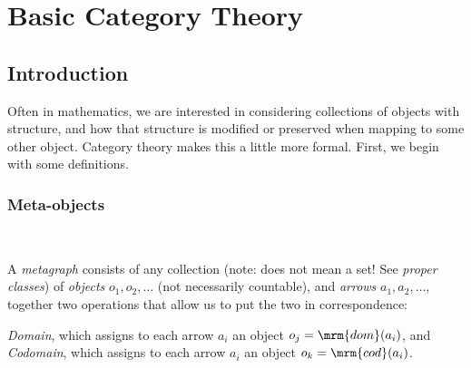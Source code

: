 \documentclass{fkbook}
\theoremstyle{snazzydefinition}
\begin{document}
\chapter{Basic Category Theory}
\section{Introduction}
Often in mathematics, we are interested in considering collections of
objects with structure, and how that structure is modified or
preserved when mapping to some other object. Category theory makes
this a little more formal. First, we begin with some definitions.\\

\subsection{Meta-objects}~
\begin{definition}[Metagraph]
  A \emph{metagraph} consists of any collection (note: does not mean a
  set! See \emph{proper classes}) of \emph{objects} $o_1, o_2,
  \ldots$ (not necessarily countable), and \emph{arrows} $a_1, a_2,
  \ldots$, together two operations that allow us to put the two in
  correspondence:\\
\end{definition}
\begin{definition}
  \emph{Domain}, which assigns to each arrow $a_i$ an object $o_j =
  \mrm{dom}(a_i)$, and \emph{Codomain}, which assigns to each arrow
  $a_i$ an object $o_k = \mrm{cod}(a_i)$.
\end{definition}
\end{document}
